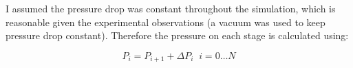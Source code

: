 
I assumed the pressure drop was constant throughout the simulation, which is reasonable given the experimental observations (a vacuum was used to keep pressure drop constant). Therefore the pressure on each stage is calculated using:


\begin{equation}
    P_i = P_{i+1} + \Delta P_i \;\; i=0\dots N
\end{equation}

